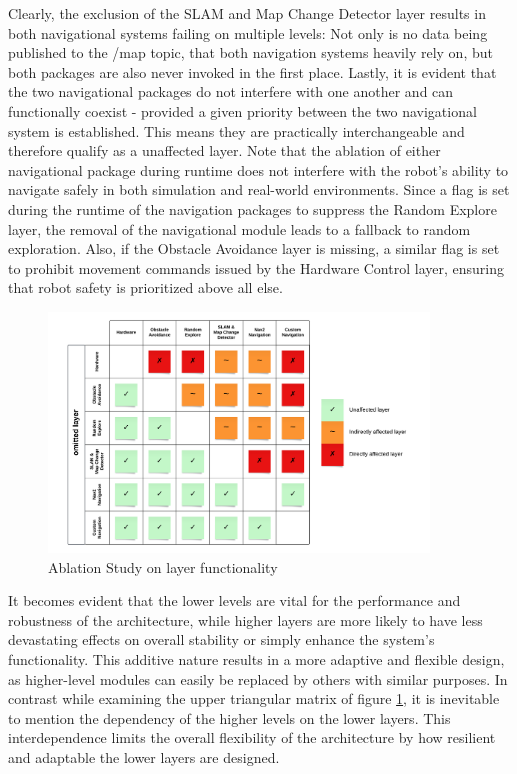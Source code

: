 \documentclass[%
paper=A4,               %
twoside=true,           %
openright,              %
11pt,                   %
bibliography=totoc,     %
titlepage=on,           %
DIV=12,                 %
BCOR=1.5cm,             %
parskip=half,            %
final
]{scrreprt}
\begin{document}
	Clearly, the exclusion of the SLAM and Map Change Detector layer results in both navigational systems failing on multiple levels: Not only is no data being published to the /map topic, that both navigation systems heavily rely on, but both packages are also never invoked in the first place.  
	Lastly, it is evident that the two navigational packages do not interfere with one another and can functionally coexist - provided a given priority between the two navigational system is established. This means they are practically interchangeable and therefore qualify as a unaffected layer. 
	Note that the ablation of either navigational package during runtime does not interfere with the robot's ability to navigate safely in both simulation and real-world environments. Since a flag is set during the runtime of the navigation packages to suppress the Random Explore layer, the removal of the navigational module leads to a fallback to random exploration. Also, if the Obstacle Avoidance layer is missing, a similar flag is set to prohibit movement commands issued by the Hardware Control layer, ensuring that robot safety is prioritized above all else.
	
	
	\begin{figure}[H]
		\centering
		\includegraphics[width=0.9\textwidth]{Graphics/AblationStudy}
		\caption{Ablation Study on layer functionality}
		\label{fig: fig9}
	\end{figure}
	
	It becomes evident that the lower levels are vital for the performance and robustness of the architecture, while higher layers are more likely to have less devastating effects on overall stability or simply enhance the system's functionality. This additive nature results in a more adaptive and flexible design, as higher-level modules can easily be replaced by others with similar purposes. In contrast while examining the upper triangular matrix of figure \ref{fig: fig9}, it is inevitable to mention the dependency of the higher levels on the lower layers. This interdependence limits the overall flexibility of the architecture by how resilient and adaptable the lower layers are designed. 
	
\end{document}
